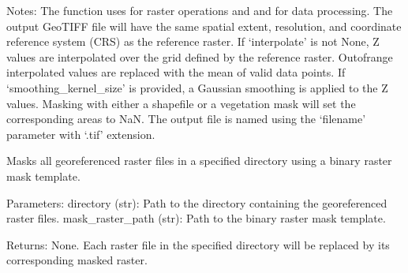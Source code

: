 \documentclass[letterpaper,10pt,english]{sphinxmanual}
\begin{document}
\begin{fulllineitems}
\begin{description}
\sphinxAtStartPar
Notes:
\sphinxhyphen{} The function uses  for raster operations and  and  for data processing.
\sphinxhyphen{} The output GeoTIFF file will have the same spatial extent, resolution, and coordinate reference system (CRS) as the reference raster.
\sphinxhyphen{} If ‘interpolate’ is not None, Z values are interpolated over the grid defined by the reference raster. Out\sphinxhyphen{}of\sphinxhyphen{}range interpolated values are replaced with the mean of valid data points.
\sphinxhyphen{} If ‘smoothing\_kernel\_size’ is provided, a Gaussian smoothing is applied to the Z values.
\sphinxhyphen{} Masking with either a shapefile or a vegetation mask will set the corresponding areas to NaN.
\sphinxhyphen{} The output file is named using the ‘filename’ parameter with ‘.tif’ extension.

\end{description}

\end{fulllineitems}


\begin{fulllineitems}
\label{\detokenize{akhdefo_functions:akhdefo_functions.Akhdefo_GOI.linear_VEL}}
\pysigstartsignatures
{}
\pysigstopsignatures
\end{fulllineitems}


\begin{fulllineitems}
\label{\detokenize{akhdefo_functions:akhdefo_functions.Akhdefo_GOI.mask_all_rasters_in_directory}}
\pysigstartsignatures
{}
\pysigstopsignatures
\sphinxAtStartPar
Masks all georeferenced raster files in a specified directory using a binary raster mask template.

\sphinxAtStartPar
Parameters:
\sphinxhyphen{} directory (str): Path to the directory containing the georeferenced raster files.
\sphinxhyphen{} mask\_raster\_path (str): Path to the binary raster mask template.

\sphinxAtStartPar
Returns:
None. Each raster file in the specified directory will be replaced by its corresponding masked raster.

\end{fulllineitems}
\end{document}
